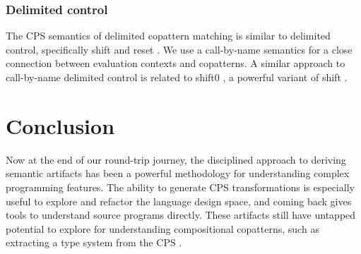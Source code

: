 \documentclass[sigplan,screen]{acmart}
\begin{document}
\subsubsection*{Delimited control}
%
The CPS semantics of delimited copattern matching is similar to delimited
control, specifically shift and reset
\cite{FunctionalAbstractionTypedContexts,AbstractingControl}.  We use a
call-by-name semantics for a close connection between evaluation contexts and
copatterns.  A similar approach to call-by-name delimited control
\cite{HerbelinG08} is related to shift0 \cite{DownenAriola2014CSCC}, a powerful
variant of shift \cite{materzok2011subtyping,materzok2012dynamic}.

\section{Conclusion}
\label{sec:conclusion}

Now at the end of our round-trip journey, the disciplined approach to deriving
semantic artifacts has been a powerful methodology for understanding complex
programming features.  The ability to generate CPS transformations is especially
useful to explore and refactor the language design space, and coming back gives
tools to understand source programs directly.  These artifacts still have
untapped potential to explore for understanding compositional copatterns, such
as extracting a type system from the CPS
\cite{FunctionalAbstractionTypedContexts}.







\appendix


\end{document}
